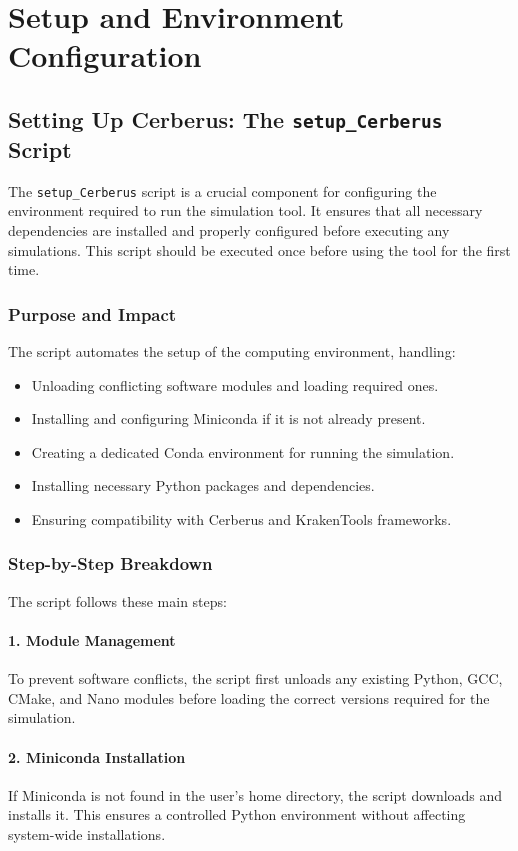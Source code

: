 \documentclass{article}
\begin{document}
\clearpage
\section{Setup and Environment Configuration}\label{sec:set_up_env}
\subsection{Setting Up Cerberus: The \texttt{setup\_Cerberus} Script}
The \texttt{setup\_Cerberus} script is a crucial component for configuring the environment required to run the simulation tool. It ensures that all necessary dependencies are installed and properly configured before executing any simulations. This script should be executed once before using the tool for the first time.

\subsubsection{Purpose and Impact}
The script automates the setup of the computing environment, handling:
\begin{itemize}
    \item Unloading conflicting software modules and loading required ones.
    \item Installing and configuring Miniconda if it is not already present.
    \item Creating a dedicated Conda environment for running the simulation.
    \item Installing necessary Python packages and dependencies.
    \item Ensuring compatibility with Cerberus and KrakenTools frameworks.
\end{itemize}

\subsubsection{Step-by-Step Breakdown}
The script follows these main steps:

\paragraph{1. Module Management}  
To prevent software conflicts, the script first unloads any existing Python, GCC, CMake, and Nano modules before loading the correct versions required for the simulation.

\paragraph{2. Miniconda Installation}  
If Miniconda is not found in the user's home directory, the script downloads and installs it. This ensures a controlled Python environment without affecting system-wide installations.
\end{document}

